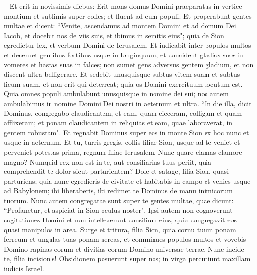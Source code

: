 \begin{biblechapter}   
\verse Et erit in novissimis diebus: Erit mons domus Domini praeparatus in vertice montium et sublimis super colles; et fluent ad eum populi. 
\verse Et properabunt gentes multae et dicent: “Venite, ascendamus ad montem Domini et ad domum Dei Iacob, et docebit nos de viis suis, et ibimus in semitis eius"; quia de Sion egredietur lex, et verbum Domini de Ierusalem. 
\verse Et iudicabit inter populos multos et decernet gentibus fortibus usque in longinquum; et concident gladios suos in vomeres et hastas suas in falces; non sumet gens adversus gentem gladium, et non discent ultra belligerare. 
\verse Et sedebit unusquisque subtus vitem suam et subtus ficum suam, et non erit qui deterreat; quia os Domini exercituum locutum est. 
\verse Quia omnes populi ambulabunt unusquisque in nomine dei sui; nos autem ambulabimus in nomine Domini Dei nostri in aeternum et ultra. 
\verse “In die illa, dicit Dominus, congregabo claudicantem, et eam, quam eieceram, colligam et quam afflixeram; 
\verse et ponam claudicantem in reliquias et eam, quae laboraverat, in gentem robustam". Et regnabit Dominus super eos in monte Sion ex hoc nunc et usque in aeternum. 
\verse Et tu, turris gregis, collis filiae Sion, usque ad te veniet et perveniet potestas prima, regnum filiae Ierusalem. 
\verse Nunc quare clamas clamore magno? Numquid rex non est in te, aut consiliarius tuus periit, quia comprehendit te dolor sicut parturientem? 
\verse Dole et satage, filia Sion, quasi parturiens; quia nunc egredieris de civitate et habitabis in campo et venies usque ad Babylonem; ibi liberaberis, ibi redimet te Dominus de manu inimicorum tuorum. 
\verse Nunc autem congregatae sunt super te gentes multae, quae dicunt: “Profanetur, et aspiciat in Sion oculus noster". 
\verse Ipsi autem non cognoverunt cogitationes Domini et non intellexerunt consilium eius, quia congregavit eos quasi manipulos in area. 
\verse Surge et tritura, filia Sion, quia cornu tuum ponam ferreum et ungulas tuas ponam aereas, et comminues populos multos et vovebis Domino rapinas eorum et divitias eorum Domino universae terrae. 
\verse Nunc incide te, filia incisionis! Obsidionem posuerunt super nos; in virga percutiunt maxillam iudicis Israel. 
\end{biblechapter}

